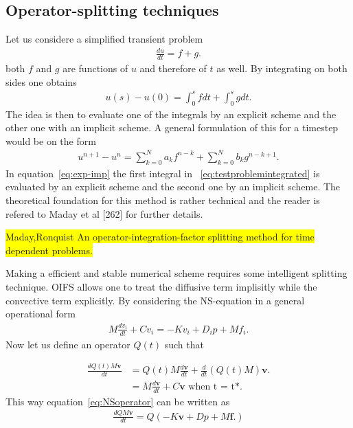 \subsection{Operator-splitting techniques }
Let us considere a simplified transient problem 
\begin{align}
    \frac{du}{dt} = f + g.
    \label{eq:testproblem}
\end{align}
both $f$ and $g$ are functions of $u$ and therefore of $t$ as well. By integrating on both sides one obtains
\begin{align}
    u(s) - u(0) = \int_0^s f dt + \int_0^s g dt.
    \label{eq:testproblemintegrated}
\end{align}
The idea is then to evaluate one of the integrals by an explicit scheme and the other one with an implicit scheme.
A general formulation of this for a timestep would be on the form 
\begin{align}
    u^{n+1}-u^{n} = \sum_{k = 0}^{N} a_k f^{n-k}+\sum_{k = 0}^{N} b_k g^{n-k+1}.
    \label{eq:exp-imp}
\end{align}
In equation~\ref{eq:exp-imp} the first integral in ~\ref{eq:testproblemintegrated} is evaluated by 
an explicit scheme and the second one by an implicit scheme. The theoretical foundation for 
this method is rather technical and the reader is refered to Maday et al [262] for further details.

\colorbox{yellow}{Maday,Ronquist An operator-integration-factor splitting method for time dependent problems.}



Making a efficient and stable numerical scheme requires some intelligent splitting technique. 
OIFS allows one to treat the diffusive term implisitly while the convective term explicitly.
By considering the NS-equation in a general operational form 
\begin{align}
    M\frac{d v_i}{dt} + Cv_i = -Kv_i +D_i p +Mf_i.
    \label{eq:NSoperator}
\end{align}
Now let us define an operator $Q(t)$ such that 

\begin{align}
    \frac{dQ(t)M\mathbf{v}}{dt} &=  Q(t)M\frac{d\mathbf{v}}{dt} + \frac{d}{dt}(Q(t)M)\mathbf{v}.\\
    &= M\frac{d\mathbf{v}}{dt} + C\mathbf{v} \text{  when t = t*. }
    \label{eq:integrationalfactor}
\end{align}
%
This way equation~\ref{eq:NSoperator} can be written as 
\begin{align}
    \frac{d QM\mathbf{v}}{dt} =Q( -K\mathbf{v} +D p +M\mathbf{f}.)
    \label{eq:NSoperatorOIFS}
\end{align}

